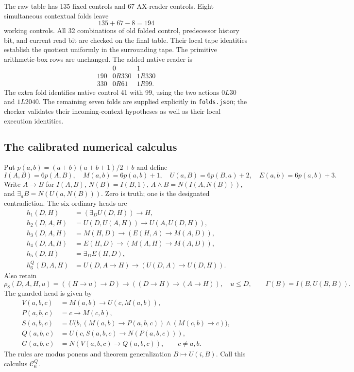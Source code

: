 The raw table has 135 fixed controls and 67 AX-reader controls. Eight
simultaneous contextual folds leave
\[
                         135+67-8=194
\]
working controls. All 32 combinations of old folded control, predecessor
history bit, and current read bit are checked on the final table. Their
local tape identities establish the quotient uniformly in the surrounding
tape. The primitive arithmetic-box rows are unchanged. The added native
reader is
\[
\begin{array}{c|cc}
 &0&1\\\hline
190&0R330&1R330\\
330&0R61&1R99.
\end{array}
\]
The extra fold identifies native control 41 with 99, using the two actions
$0L30$ and $1L2040$. The remaining seven folds are supplied explicitly in
\texttt{folds.json}; the checker validates their incoming-context
hypotheses as well as their local execution identities.

\subsection{The calibrated numerical calculus}

Put $p(a,b)=(a+b)(a+b+1)/2+b$ and define
\[
 I(A,B)=6p(A,B),\quad M(a,b)=6p(a,b)+1,\quad
 U(a,B)=6p(B,a)+2,\quad E(a,b)=6p(a,b)+3.
\]
Write $A\to B$ for $I(A,B)$, $N(B)=I(B,1)$,
$A\wedge B=N(I(A,N(B)))$, and $\exists_a B=N(U(a,N(B)))$.
Zero is truth; one is the designated contradiction. The six ordinary
heads are
\begin{align*}
 h_1(D,H)&=(\exists_D U(D,H))\to H,\\
 h_2(D,A,H)&=U(D,U(A,H))\to U(A,U(D,H)),\\
 h_3(D,A,H)&=M(H,D)\to(E(H,A)\to M(A,D)),\\
 h_4(D,A,H)&=E(H,D)\to(M(A,H)\to M(A,D)),\\
 h_5(D,H)&=\exists_D E(H,D),\\
 h_6^Q(D,A,H)&=U(D,A\to H)\to(U(D,A)\to U(D,H)).
\end{align*}
Also retain
\[
 \rho_8(D,A,H,u)=((H\to u)\to D)\to((D\to H)\to(A\to H)),
 \quad u\le D,
 \qquad \Gamma(B)=I(B,U(B,B)).
\]
The guarded head is given by
\begin{align*}
 V(a,b,c)&=M(a,b)\to U(c,M(a,b)),\\
 P(a,b,c)&=c\to M(c,b),\\
 S(a,b,c)&=U\bigl(b,(M(a,b)\to P(a,b,c))\wedge(M(c,b)\to c)\bigr),\\
 Q(a,b,c)&=U(c,S(a,b,c)\to N(P(a,b,c))),\\
 G(a,b,c)&=N(V(a,b,c)\to Q(a,b,c)),\qquad c\ne a,b.
\end{align*}
The rules are modus ponens and theorem generalization
$B\mapsto U(i,B)$. Call this calculus $\mathcal C_6^Q$.

